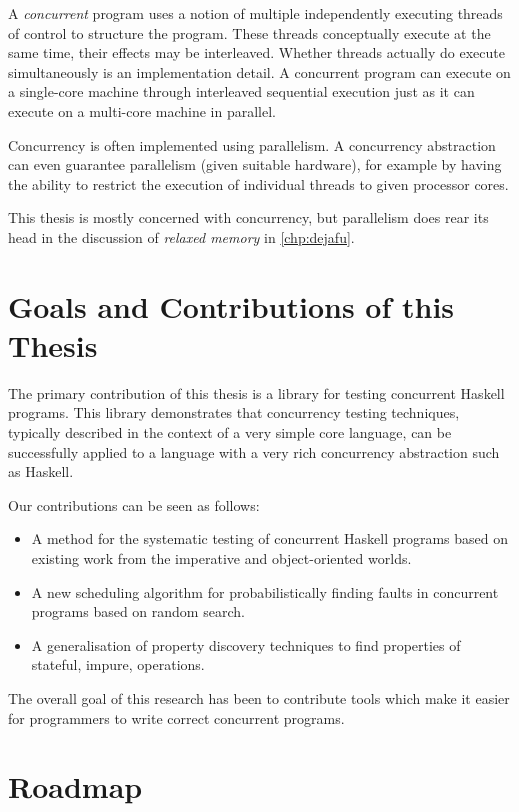 A \emph{concurrent} program uses a notion of multiple independently executing
threads of control to structure the program.  These threads conceptually execute
at the same time, their effects may be interleaved.  Whether threads actually do
execute simultaneously is an implementation detail.  A concurrent program can
execute on a single-core machine through interleaved sequential execution just
as it can execute on a multi-core machine in parallel.

Concurrency is often implemented using parallelism.  A concurrency abstraction
can even guarantee parallelism (given suitable hardware), for example by having
the ability to restrict the execution of individual threads to given processor
cores.

This thesis is mostly concerned with concurrency, but parallelism does rear its
head in the discussion of \emph{relaxed memory} in \cref{chp:dejafu}.

\section{Goals and Contributions of this Thesis}
\label{sec:intro-contributions}

The primary contribution of this thesis is a library for testing concurrent
Haskell programs.  This library demonstrates that concurrency testing
techniques, typically described in the context of a very simple core language,
can be successfully applied to a language with a very rich concurrency
abstraction such as Haskell.

Our contributions can be seen as follows:

\begin{itemize}
\item A method for the systematic testing of concurrent Haskell programs based
on existing work from the imperative and object-oriented worlds.
\item A new scheduling algorithm for probabilistically finding faults in concurrent
programs based on random search.
\item A generalisation of property discovery techniques to find properties of
stateful, impure, operations.
\end{itemize}

The overall goal of this research has been to contribute tools which make it
easier for programmers to write correct concurrent programs.

\section{Roadmap}
\label{sec:intro-roadmap}

